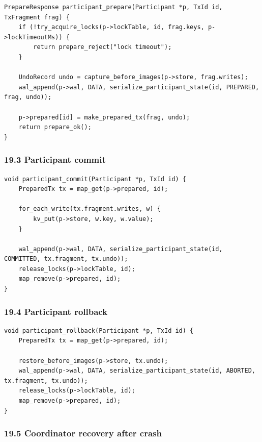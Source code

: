 \documentclass[10pt,letterpaper]{article}
\begin{document}
\begin{verbatim}
PrepareResponse participant_prepare(Participant *p, TxId id, TxFragment frag) {
    if (!try_acquire_locks(p->lockTable, id, frag.keys, p->lockTimeoutMs)) {
        return prepare_reject("lock timeout");
    }

    UndoRecord undo = capture_before_images(p->store, frag.writes);
    wal_append(p->wal, DATA, serialize_participant_state(id, PREPARED, frag, undo));

    p->prepared[id] = make_prepared_tx(frag, undo);
    return prepare_ok();
}
\end{verbatim}

\subsubsection*{19.3 Participant commit}

\begin{verbatim}
void participant_commit(Participant *p, TxId id) {
    PreparedTx tx = map_get(p->prepared, id);

    for_each_write(tx.fragment.writes, w) {
        kv_put(p->store, w.key, w.value);
    }

    wal_append(p->wal, DATA, serialize_participant_state(id, COMMITTED, tx.fragment, tx.undo));
    release_locks(p->lockTable, id);
    map_remove(p->prepared, id);
}
\end{verbatim}

\subsubsection*{19.4 Participant rollback}

\begin{verbatim}
void participant_rollback(Participant *p, TxId id) {
    PreparedTx tx = map_get(p->prepared, id);

    restore_before_images(p->store, tx.undo);
    wal_append(p->wal, DATA, serialize_participant_state(id, ABORTED, tx.fragment, tx.undo));
    release_locks(p->lockTable, id);
    map_remove(p->prepared, id);
}
\end{verbatim}

\subsubsection*{19.5 Coordinator recovery after crash}
\end{document}
